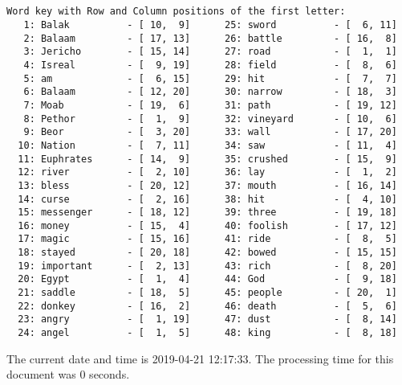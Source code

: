 \documentclass[12pt,a4paper,article]{memoir}\usepackage[]{graphicx}\usepackage[]{color}
\begin{document}
\begin{verbatim}


Word key with Row and Column positions of the first letter:
   1: Balak          - [ 10,  9]      25: sword          - [  6, 11]
   2: Balaam         - [ 17, 13]      26: battle         - [ 16,  8]
   3: Jericho        - [ 15, 14]      27: road           - [  1,  1]
   4: Isreal         - [  9, 19]      28: field          - [  8,  6]
   5: am             - [  6, 15]      29: hit            - [  7,  7]
   6: Balaam         - [ 12, 20]      30: narrow         - [ 18,  3]
   7: Moab           - [ 19,  6]      31: path           - [ 19, 12]
   8: Pethor         - [  1,  9]      32: vineyard       - [ 10,  6]
   9: Beor           - [  3, 20]      33: wall           - [ 17, 20]
  10: Nation         - [  7, 11]      34: saw            - [ 11,  4]
  11: Euphrates      - [ 14,  9]      35: crushed        - [ 15,  9]
  12: river          - [  2, 10]      36: lay            - [  1,  2]
  13: bless          - [ 20, 12]      37: mouth          - [ 16, 14]
  14: curse          - [  2, 16]      38: hit            - [  4, 10]
  15: messenger      - [ 18, 12]      39: three          - [ 19, 18]
  16: money          - [ 15,  4]      40: foolish        - [ 17, 12]
  17: magic          - [ 15, 16]      41: ride           - [  8,  5]
  18: stayed         - [ 20, 18]      42: bowed          - [ 15, 15]
  19: important      - [  2, 13]      43: rich           - [  8, 20]
  20: Egypt          - [  1,  4]      44: God            - [  9, 18]
  21: saddle         - [ 18,  5]      45: people         - [ 20,  1]
  22: donkey         - [ 16,  2]      46: death          - [  5,  6]
  23: angry          - [  1, 19]      47: dust           - [  8, 14]
  24: angel          - [  1,  5]      48: king           - [  8, 18]

\end{verbatim}

\clearpage
The current date and time is 2019-04-21 12:17:33. The processing time for
this document was 0 seconds.
\end{document}
